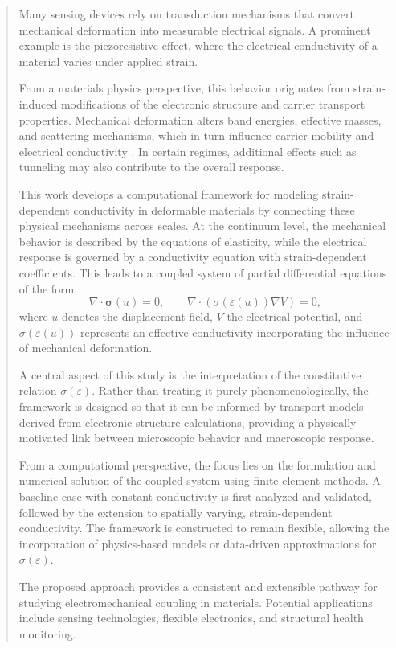 \documentclass[11pt,letterpaper]{article}
\begin{document}
\maketitle

\begin{abstract}

Many sensing devices rely on transduction mechanisms that convert mechanical deformation into measurable electrical signals.
A prominent example is the piezoresistive effect, where the electrical conductivity of a material varies under applied strain.

From a materials physics perspective, this behavior originates from strain-induced modifications of the electronic structure and carrier transport properties. 
Mechanical deformation alters band energies, effective masses, and scattering mechanisms, which in turn influence carrier mobility and electrical conductivity \cite{hamaguchi}. 
In certain regimes, additional effects such as tunneling may also contribute to the overall response.

This work develops a computational framework for modeling strain-dependent conductivity in deformable materials by connecting these physical mechanisms across scales.
At the continuum level, the mechanical behavior is described by the equations of elasticity, while the electrical response is governed by a conductivity equation with strain-dependent coefficients. 
This leads to a coupled system of partial differential equations of the form
\[
\nabla \cdot \boldsymbol{\sigma}(u) = 0, \qquad
\nabla \cdot \left( \sigma(\varepsilon(u)) \nabla V \right) = 0,
\]
where $u$ denotes the displacement field, $V$ the electrical potential, and $\sigma(\varepsilon(u))$ represents an effective conductivity incorporating the influence of mechanical deformation.

A central aspect of this study is the interpretation of the constitutive relation $\sigma(\varepsilon)$.
Rather than treating it purely phenomenologically, the framework is designed so that it can be informed by transport models derived from electronic structure calculations, providing a physically motivated link between microscopic behavior and macroscopic response.

From a computational perspective, the focus lies on the formulation and numerical solution of the coupled system using finite element methods.
A baseline case with constant conductivity is first analyzed and validated, followed by the extension to spatially varying, strain-dependent conductivity.
The framework is constructed to remain flexible, allowing the incorporation of physics-based models or data-driven approximations for $\sigma(\varepsilon)$.

The proposed approach provides a consistent and extensible pathway for studying electromechanical coupling in materials.
Potential applications include sensing technologies, flexible electronics, and structural health monitoring.

\end{abstract}
\end{document}
